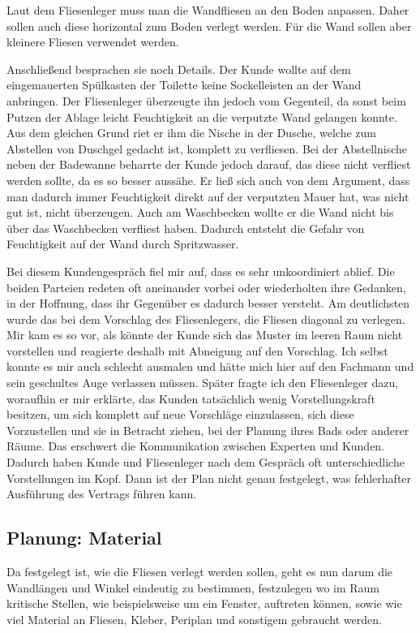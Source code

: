 Laut dem Fliesenleger muss man die Wandfliesen an den Boden anpassen. Daher sollen auch diese horizontal zum Boden verlegt werden. Für die Wand sollen aber kleinere Fliesen verwendet werden.

Anschließend besprachen sie noch Details. Der Kunde wollte auf dem eingemauerten Spülkasten der Toilette keine Sockelleisten an der Wand anbringen. Der Fliesenleger überzeugte ihn jedoch vom Gegenteil, da sonst beim Putzen der Ablage leicht Feuchtigkeit an die verputzte Wand gelangen konnte. Aus dem gleichen Grund riet er ihm die Nische in der Dusche, welche zum Abstellen von Duschgel gedacht ist, komplett zu verfliesen. Bei der Abstellnische neben der Badewanne beharrte der Kunde jedoch darauf, das diese nicht verfliest werden sollte, da es so besser aussähe. Er ließ sich auch von dem Argument, dass man dadurch immer Feuchtigkeit direkt auf der verputzten Mauer hat, was nicht gut ist, nicht überzeugen. Auch am Waschbecken wollte er die Wand nicht bis über das Waschbecken verfliest haben. Dadurch entsteht die Gefahr von Feuchtigkeit auf der Wand durch Spritzwasser.

Bei diesem Kundengespräch fiel mir auf, dass es sehr unkoordiniert ablief. Die beiden Parteien redeten oft aneinander vorbei oder wiederholten ihre Gedanken, in der Hoffnung, dass ihr Gegenüber es dadurch besser versteht. Am deutlichsten wurde das bei dem Vorschlag des Fliesenlegers, die Fliesen diagonal zu verlegen. Mir kam es so vor, als könnte der Kunde sich das Muster im leeren Raum nicht vorstellen und reagierte deshalb mit Abneigung auf den Vorschlag. Ich selbst konnte es mir auch schlecht ausmalen und hätte mich hier auf den Fachmann und sein geschultes Auge verlassen müssen. Später fragte ich den Fliesenleger dazu, woraufhin er mir erklärte, das Kunden tatsächlich wenig Vorstellungskraft besitzen, um sich komplett auf neue Vorschläge einzulassen, sich diese Vorzustellen und sie in Betracht ziehen, bei der Planung ihres Bads oder anderer Räume. Das erschwert die Kommunikation zwischen Experten und Kunden. Dadurch haben Kunde und Fliesenleger nach dem Gespräch oft unterschiedliche Vorstellungen im Kopf. Dann ist der Plan nicht genau festgelegt, was fehlerhafter Ausführung des Vertrags führen kann.

\subsection{Planung: Material}

Da festgelegt ist, wie die Fliesen verlegt werden sollen, geht es nun darum die Wandlängen und Winkel eindeutig zu bestimmen, festzulegen wo im Raum kritische Stellen, wie beispielsweise um ein Fenster, auftreten können, sowie wie viel Material an Fliesen, Kleber, Periplan und sonstigem gebraucht werden.

